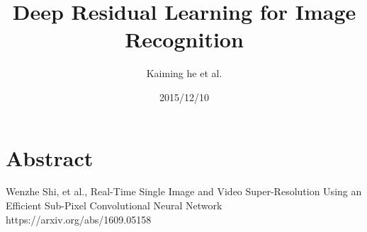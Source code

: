 \documentclass[uplatex, dvipdfmx]{jsarticle}
\title{Deep Residual Learning for Image Recognition}
\author{Kaiming he et al.}
\date{2015/12/10}
\theoremstyle{definition}
\begin{document}
    \maketitle
    \abovedisplayskip=10.0pt%
    \belowdisplayskip=10.0pt%
    \section{Abstract}
    \newpage
    \begin{thebibliography}{10}
            Wenzhe Shi, et al., 
            Real-Time Single Image and Video Super-Resolution Using an Efficient Sub-Pixel Convolutional Neural Network \\
            https://arxiv.org/abs/1609.05158
    \end{thebibliography}
    
\end{document}
